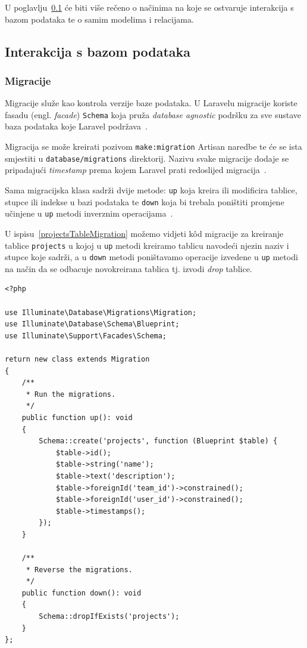 U poglavlju~\ref{subsection:dbInteraction} će biti više rečeno o načinima na koje se ostvaruje interakcija s bazom podataka te o samim modelima i relacijama.

\subsection{Interakcija s bazom podataka}
\label{subsection:dbInteraction}

\subsubsection{Migracije}
Migracije služe kao kontrola verzije baze podataka. U Laravelu migracije koriste fasadu (engl. \textit{facade}) \texttt{Schema} koja pruža \textit{database agnostic} podršku za sve sustave baza podataka koje Laravel podržava~\cite{migrations}.

Migracija se može kreirati pozivom \texttt{make:migration} Artisan naredbe te će se ista smjestiti u \texttt{database/migrations} direktorij. Nazivu svake migracije dodaje se pripadajući \textit{timestamp} prema kojem Laravel prati redoslijed migracija~\cite{migrations}.

Sama migracijska klasa sadrži dvije metode: \texttt{up} koja kreira ili modificira tablice, stupce ili indekse u bazi podataka te \texttt{down} koja bi trebala poništiti promjene učinjene u \texttt{up} metodi inverznim operacijama~\cite{migrations}.

U ispisu~\ref{projectsTableMigration} možemo vidjeti k\^od migracije za kreiranje tablice \texttt{projects} u kojoj u \texttt{up} metodi kreiramo tablicu navodeći njezin naziv i stupce koje sadrži, a u \texttt{down} metodi poništavamo operacije izvedene u \texttt{up} metodi na način da se odbacuje novokreirana tablica tj. izvodi \textit{drop} tablice.

\begin{lstlisting}[caption={Migracija za kreiranje tablice \texttt{projects}}, label=projectsTableMigration]
<?php

use Illuminate\Database\Migrations\Migration;
use Illuminate\Database\Schema\Blueprint;
use Illuminate\Support\Facades\Schema;

return new class extends Migration
{
    /**
     * Run the migrations.
     */
    public function up(): void
    {
        Schema::create('projects', function (Blueprint $table) {
            $table->id();
            $table->string('name');
            $table->text('description');
            $table->foreignId('team_id')->constrained();
            $table->foreignId('user_id')->constrained();
            $table->timestamps();
        });
    }

    /**
     * Reverse the migrations.
     */
    public function down(): void
    {
        Schema::dropIfExists('projects');
    }
};

\end{lstlisting}


